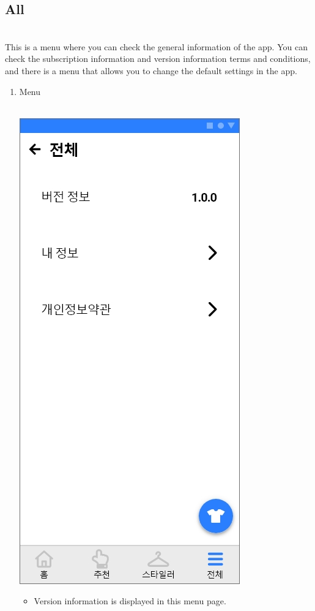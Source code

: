 \documentclass[conference]{IEEEtran}
\begin{document}
\subsection {All} \\
This is a menu where you can check the general information of the app. You can check the subscription information and version information terms and conditions, and there is a menu that allows you to change the default settings in the app.
\begin{enumerate}
    \item Menu \\ \\
    \centerline{\includegraphics[scale=0.32]{assets/전체.jpg}}
    \begin{itemize}
    \item[] Version information is displayed in this menu page. \\

\end{itemize}
\end{enumerate}
\end{document}
